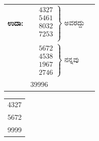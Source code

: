 \begin{enumerate}
\begin{minipage}[c]{5cm}
\begin{tabular}[t]{lll}
{\bf ಉದಾ:} & 
$
\left.
\begin{aligned}
& 4327 \\[-0.2cm]
& 5461 \\[-0.2cm]
& 8032 \\[-0.2cm]
& 7253 \\[5pt]
\end{aligned}
\right\}$
\quad ಅವರದ್ದು\\[0.4cm]
&
$
\left.
\begin{aligned}
& 5672\\[-0.2cm]
& 4538\\[-0.2cm]
& 1967\\[-0.2cm]
& 2746
\end{aligned}
\right\}$
\quad ನನ್ನವು\\\hline
& $39996$
\end{tabular}
\end{minipage}
\begin{minipage}[c]{4cm}
\begin{tabular}{l}
4327\\
5672\\
\hline
9999
\end{tabular}
\end{minipage}
\end{enumerate}
